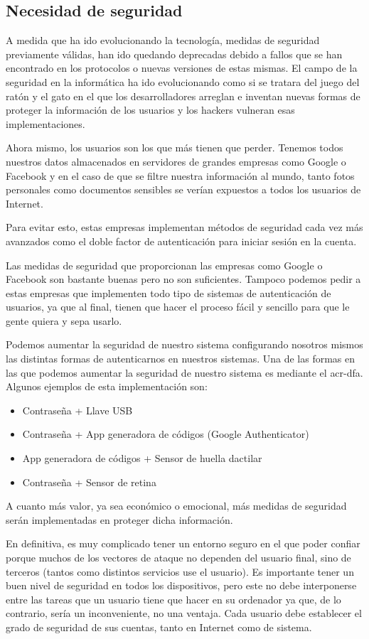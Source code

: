 \documentclass[twoside, titlepage, 12pt, a4paper]{article}
\begin{document}
\subsection{Necesidad de seguridad}
A medida que ha ido evolucionando la tecnología, medidas de seguridad previamente válidas, han ido quedando deprecadas debido a fallos que se han encontrado en los protocolos o nuevas versiones de estas mismas. El campo de la seguridad en la informática ha ido evolucionando como si se tratara del juego del ratón y el gato en el que los desarrolladores arreglan e inventan nuevas formas de proteger la información de los usuarios y los hackers vulneran esas implementaciones.\par Ahora mismo, los usuarios son los que más tienen que perder. Tenemos todos nuestros datos almacenados en servidores de grandes empresas como Google o Facebook y en el caso de que se filtre nuestra información al mundo, tanto fotos personales como documentos sensibles se verían expuestos a todos los usuarios de Internet.\par Para evitar esto, estas empresas implementan métodos de seguridad cada vez más avanzados como el doble factor de autenticación para iniciar sesión en la cuenta.\par Las medidas de seguridad que proporcionan las empresas como Google o Facebook son bastante buenas pero no son suficientes. Tampoco podemos pedir a estas empresas que implementen todo tipo de sistemas de autenticación de usuarios, ya que al final, tienen que hacer el proceso fácil y sencillo para que le gente quiera y sepa usarlo.\par Podemos aumentar la seguridad de nuestro sistema configurando nosotros mismos las distintas formas de autenticarnos en nuestros sistemas. Una de las formas en las que podemos aumentar la seguridad de nuestro sistema es mediante el \gls{acr-dfa}. Algunos ejemplos de esta implementación son:
\begin{itemize}
	\item Contraseña + Llave USB
	\item Contraseña + App generadora de códigos (Google Authenticator)
	\item App generadora de códigos + Sensor de huella dactilar
	\item Contraseña + Sensor de retina
\end{itemize}
A cuanto más valor, ya sea económico o emocional, más medidas de seguridad serán implementadas en proteger dicha información.\par
En definitiva, es muy complicado tener un entorno seguro en el que poder confiar porque muchos de los vectores de ataque no dependen del usuario final, sino de terceros (tantos como distintos servicios use el usuario). Es importante tener un buen nivel de seguridad en todos los dispositivos, pero este no debe interponerse entre las tareas que un usuario tiene que hacer en su ordenador ya que, de lo contrario, sería un inconveniente, no una ventaja. Cada usuario debe establecer el grado de seguridad de sus cuentas, tanto en Internet como de sistema.\par
\end{document}
